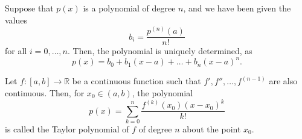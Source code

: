 \documentclass[11pt]{article}
\def\R{\mathbb{R}}
\theoremstyle{definition}
\theoremstyle{remark}
\numberwithin{equation}{module}
\begin{document}
    \begin{lemma}
        Suppose that $p(x)$ is a polynomial of degree $n$, and we have been given the
        values \[
            b_i = \frac{p^{(n)}(a)}{n!}
        \] for all $i = 0, \dots, n$. Then, the polynomial is uniquely determined,
        as \[
            p(x) = b_0 + b_1(x - a) + \dots + b_n(x - a)^n.
        \] 
    \end{lemma}

    \begin{definition}
        Let $f\colon [a, b] \to \R$ be a continuous function such that $f', f'',
        \dots, f^{(n - 1)}$ are also continuous. Then, for $x_0 \in (a, b)$, 
        the polynomial \[
            p(x) = \sum_{k = 0}^n \frac{f^{(k)}(x_0)(x - x_0)^k}{k!}
        \] is called the Taylor polynomial of $f$ of degree $n$ about the point
        $x_0$.
    \end{definition}
\end{document}
